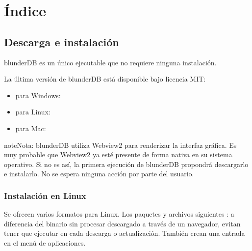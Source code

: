 \documentclass[letterpaper,10pt,spanish]{sphinxmanual}
\begin{document}
\chapter{Índice}
\label{\detokenize{index:sommaire}}
\sphinxstepscope


\section{Descarga e instalación}
\label{\detokenize{telecharge_install:telechargement-et-installation}}\label{\detokenize{telecharge_install:telecharge-install}}\label{\detokenize{telecharge_install::doc}}
\sphinxAtStartPar
blunderDB es un único ejecutable que no requiere ninguna instalación.

\sphinxAtStartPar
La última versión de blunderDB está disponible bajo licencia MIT:
\begin{itemize}
\item {} 
\sphinxAtStartPar
para Windows: 

\item {} 
\sphinxAtStartPar
para Linux: 

\item {} 
\sphinxAtStartPar
para Mac: 

\end{itemize}

\begin{sphinxadmonition}{note}{Nota:}
\sphinxAtStartPar
blunderDB utiliza Webview2 para renderizar la interfaz gráfica. Es muy probable que Webview2 ya esté presente de forma nativa en su sistema operativo. Si no es así, la primera ejecución de blunderDB propondrá descargarlo e instalarlo. No se espera ninguna acción por parte del usuario.
\end{sphinxadmonition}


\subsection{Instalación en Linux}
\label{\detokenize{telecharge_install:installation-sous-linux}}
\sphinxAtStartPar
Se ofrecen varios formatos para Linux. Los paquetes y archivos siguientes : a diferencia del binario sin procesar descargado a través de un navegador, evitan tener que ejecutar  en cada descarga o actualización. También crean una entrada en el menú de aplicaciones.
\end{document}
